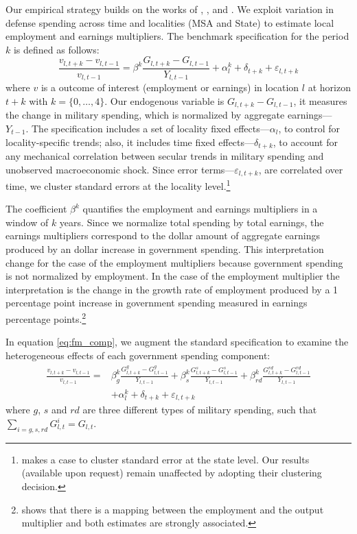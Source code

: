 \documentclass[dv_diss_main.tex]{subfiles}
\begin{document}
Our empirical strategy builds on the works of \cite{Nakamura2014}, \cite{Dupor2017}, and \cite{Auerbach2020}. We exploit variation in defense spending across time and localities (MSA and State) to
estimate local employment and earnings multipliers. The benchmark specification for the period $k$ is defined as follows:
\begin{equation}
    \frac{v_{l,t+k} - v_{l,t-1}}{v_{l,t-1}} = \beta^k \frac{G_{l,t+k}-G_{l,t-1}}{Y_{l,t-1}} + \alpha_l^k + \delta_{t+k} + \varepsilon_{l,t+k}
    \label{eq:fm_base}
\end{equation}
\noindent where $v$ is a outcome of interest (employment or earnings) in location $l$ at horizon $t+k$ with $k =\{0, 
\dots, 4\}$. Our endogenous variable is $G_{l,t+k}-G_{l,t-1}$, it measures the change in military spending, which is normalized by aggregate earnings---$Y_{t-1}$. The specification includes a set of locality fixed effects---$\alpha_l$, to control for locality-specific trends; also, it includes time fixed effects---$\delta_{t+k}$, to account for any mechanical correlation between secular trends in military spending and unobserved macroeconomic shock. Since error terms---$\varepsilon_{l,t+k}$, are correlated over time, we cluster standard errors at the locality level.\footnote{ \cite{Auerbach2020} makes a case to cluster standard error at the state level. Our results (available upon request) remain unaffected by adopting their clustering decision.} 

The coefficient $\beta^k$ quantifies the employment and earnings multipliers in a window of $k$ years. Since we normalize total spending by total earnings, the earnings multipliers correspond to the dollar amount of aggregate earnings produced by an dollar increase in government spending. This interpretation change for the case of the employment multipliers because government spending is not normalized by employment. In the case of the employment multiplier the interpretation is the change in the growth rate of employment produced by a 1 percentage point increase in government spending measured in earnings percentage points.\footnote{\cite{chodorow2019geographic} shows that there is a mapping between the employment and the output multiplier and both estimates are strongly associated.}


In equation \eqref{eq:fm_comp}, we augment the standard specification to examine the heterogeneous effects of each government spending component:
\begin{equation}
\begin{split}
    \frac{v_{l,t+k} - v_{l,t-1}}{v_{l,t-1}} = & 
    \beta_{g}^k \frac{G^{g}_{l,t+k}-G^{g}_{l,t-1}}{Y_{l,t-1}} 
    + \beta_{s}^k \frac{G^{s}_{l,t+k}-G^{s}_{l,t-1}}{Y_{l,t-1}} 
    + \beta_{rd}^k \frac{G^{rd}_{l,t+k}-G^{rd}_{l,t-1}}{Y_{l,t-1}} 
    \\ & + \alpha_l^k + \delta_{t+k} + \varepsilon_{l,t+k}
    \label{eq:fm_comp}
\end{split}
\end{equation}
\noindent where $g$, $s$ and $rd$ are three different types of military spending, such that $\sum_{i=g,s,rd}G^{i}_{l,t}=G_{l,t}$. 
\end{document}
